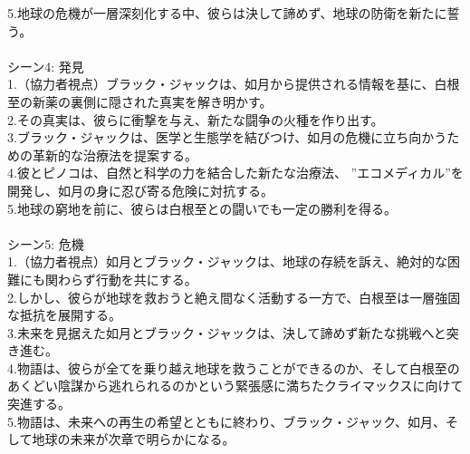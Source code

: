 \documentclass[a4j,12pt]{jsreport}
\begin{document}
\begin{breakitembox}
   5.地球の危機が一層深刻化する中、彼らは決して諦めず、地球の防衛を新たに誓う。\\
   \\
   シーン4: 発見\\
   1.（協力者視点）ブラック・ジャックは、如月から提供される情報を基に、白根至の新薬の裏側に隠された真実を解き明かす。\\
   2.その真実は、彼らに衝撃を与え、新たな闘争の火種を作り出す。\\
   3.ブラック・ジャックは、医学と生態学を結びつけ、如月の危機に立ち向かうための革新的な治療法を提案する。\\
   4.彼とピノコは、自然と科学の力を結合した新たな治療法、 ”エコメディカル”を開発し、如月の身に忍び寄る危険に対抗する。\\
   5.地球の窮地を前に、彼らは白根至との闘いでも一定の勝利を得る。\\
   \\
   シーン5: 危機\\
   1.（協力者視点）如月とブラック・ジャックは、地球の存続を訴え、絶対的な困難にも関わらず行動を共にする。\\
   2.しかし、彼らが地球を救おうと絶え間なく活動する一方で、白根至は一層強固な抵抗を展開する。\\
   3.未来を見据えた如月とブラック・ジャックは、決して諦めず新たな挑戦へと突き進む。\\
   4.物語は、彼らが全てを乗り越え地球を救うことができるのか、そして白根至のあくどい陰謀から逃れられるのかという緊張感に満ちたクライマックスに向けて突進する。\\
   5.物語は、未来への再生の希望とともに終わり、ブラック・ジャック、如月、そして地球の未来が次章で明らかになる。
\end{breakitembox}
\end{document}
